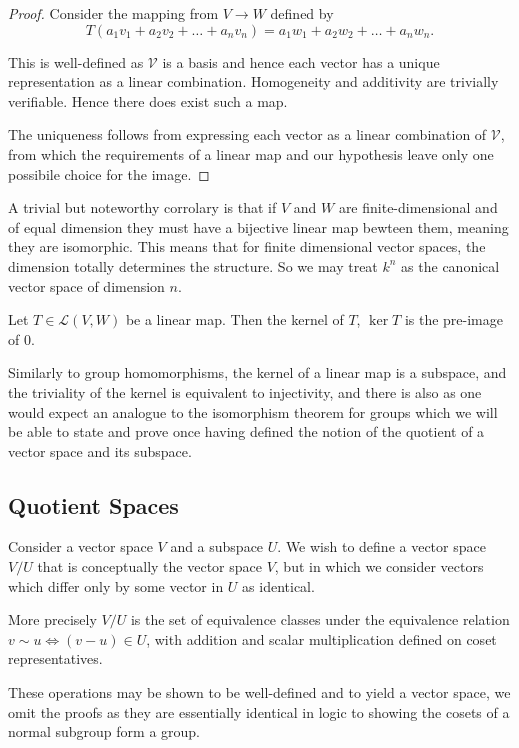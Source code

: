\documentclass[]{article}
\begin{document}
\begin{proof}
		Consider the mapping from $V \to W$ defined by
		\[
		T(a_1 v_1 + a_2 v_2 + \ldots + a_n v_n) = a_1 w_1 + a_2 w_2 + \ldots + a_n w_n
		.\] 

		This is well-defined as $\mathcal{V}$ is a basis and hence each vector has a unique representation as a linear combination. Homogeneity and additivity are trivially verifiable. Hence there does exist such a map. 

		The uniqueness follows from expressing each vector as a linear combination of $\mathcal{V}$, from which the requirements of a linear map and our hypothesis leave only one possibile choice for the image.
\end{proof}

A trivial but noteworthy corrolary is that if $V$ and $W$ are finite-dimensional and of equal dimension they must have a bijective linear map bewteen them, meaning they are isomorphic. This means that for finite dimensional vector spaces, the dimension totally determines the structure. So we may treat $k^n$ as the canonical vector space of dimension $n$.

\begin{defi} [Kernel]
		Let $T \in \mathcal{L}(V,W)$ be a linear map. Then the kernel of $T$, $\ker T$ is the pre-image of $0$.
\end{defi}

Similarly to group homomorphisms, the kernel of a linear map is a subspace, and the triviality of the kernel is equivalent to injectivity, and there is also as one would expect an analogue to the isomorphism theorem for groups which we will be able to state and prove once having defined the notion of the quotient of a vector space and its subspace.

\subsection{Quotient Spaces}

Consider a vector space $V$ and a subspace $U$. We wish to define a vector space $V / U$ that is conceptually the vector space $V$, but in which we consider vectors which differ only by some vector in $U$ as identical. 

More precisely $V / U$ is the set of equivalence classes under the equivalence relation $v \sim u \iff (v-u) \in U$, with addition and scalar multiplication defined on coset representatives. 

		These operations may be shown to be well-defined and to yield a vector space, we omit the proofs as they are essentially identical in logic to showing the cosets of a normal subgroup form a group.
\end{document}
